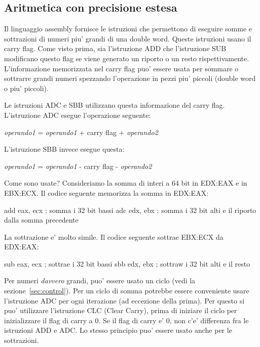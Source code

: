 \subsection{Aritmetica con precisione estesa \label{sec:ExtPrecArith} }

Il linguaggio assembly fornisce le istruzioni che permettono di 
eseguire somme e sottrazioni di numeri piu' grandi di una double word.
Queste istruzioni usano il carry flag. Come visto prima, sia 
l'istruzione {\code ADD} che l'istruzione {\code SUB}
modificano questo flag se viene generato un riporto o un resto
rispettivamente. L'informazione memorizzata nel carry flag puo'
essere usata per sommare o sottrarre grandi numeri spezzando
l'operazione in pezzi piu' piccoli (double word o piu' piccoli).

Le istruzioni {\code ADC}  e {\code SBB}  utilizzano questa
informazione del carry flag. L'istruzione {\code ADC} esegue 
l'operazione seguente:
\begin{center}
{\code \emph{operando1} = \emph{operando1} + carry flag + \emph{operando2} }
\end{center}
L'istruzione {\code SBB} invece esegue questa:
\begin{center}
{\code \emph{operando1} = \emph{operando1} - carry flag - \emph{operando2} }
\end{center}
Come sono usate? Consideriamo la somma di interi a 64 bit in EDX:EAX
 e in EBX:ECX. Il codice seguente memorizza
la somma in EDX:EAX:
\begin{AsmCodeListing}[frame=none]
      add    eax, ecx       ; somma i 32 bit bassi
      adc    edx, ebx       ; somma i 32 bit alti e il riporto dalla somma precedente
\end{AsmCodeListing}
La sottrazione e' molto simile. Il codice seguente sottrae EBX:ECX da 
EDX:EAX:
\begin{AsmCodeListing}[frame=none]
      sub    eax, ecx       ; sottrae i 32 bit bassi
      sbb    edx, ebx       ; sottraw i 32 bit alti e il resto
\end{AsmCodeListing}

Per numeri \emph{davvero} grandi, puo' essere usato un ciclo (vedi
la sezione~\ref{sec:control}). Per un ciclo di somma potrebbe
essere conveniente usare l'istruzione {\code ADC} per ogni 
iterazione (ad eccezione della prima). Per questo si puo' utilizzare
l'istruzione {\code CLC} (Clear Carry), prima di iniziare
il ciclo per inizializzare il flag di carry a 0. Se il flag di carry
e' 0, non c'e' differenza fra le istruzioni {\code ADD} e {\code ADC}.
Lo stesso principio puo' essere usato anche per le sottrazioni.  


